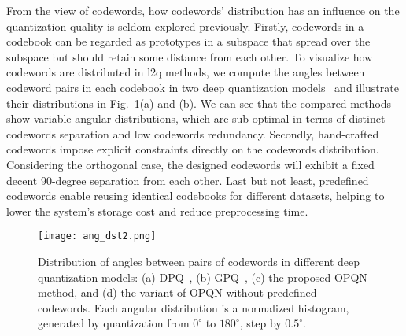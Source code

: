 \documentclass{elsarticle}
\begin{document}
From the view of codewords, how codewords' distribution has an influence on the quantization quality is seldom explored previously. Firstly, codewords in a codebook can be regarded as prototypes in a subspace that spread over the subspace but should retain some distance from each other. %
To visualize how codewords are distributed in l2q methods, we compute the angles between codeword pairs in each codebook in two deep quantization models~\cite{klein2019end,jang2020generalized} and illustrate their distributions in Fig.~\ref{ang_dst}(a) and (b). We can see that the compared methods show variable angular distributions, which are sub-optimal in terms of distinct codewords separation and low codewords redundancy. Secondly, hand-crafted codewords impose explicit constraints directly on the codewords distribution. Considering the orthogonal case, the designed codewords will exhibit a fixed decent 90-degree separation from each other. Last but not least, predefined codewords enable reusing identical codebooks for different datasets, helping to lower the system's storage cost and reduce preprocessing time.

\begin{figure}[htbp]
	\centering
	\texttt{[image: ang\_dst2.png]}
	\caption{Distribution of angles between pairs of codewords in different deep quantization models: (a) DPQ~\cite{klein2019end}, (b) GPQ~\cite{jang2020generalized}, (c) the proposed OPQN method, and (d) the variant of OPQN without predefined codewords. Each angular distribution is a normalized histogram, generated by quantization from $0^\circ$ to $180^\circ$, step by $0.5^\circ$.}
	\label{ang_dst}
\end{figure}
\end{document}
